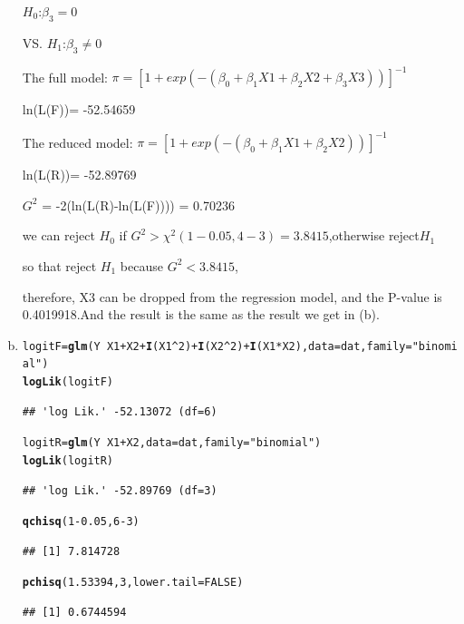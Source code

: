 \documentclass{article}\usepackage[]{graphicx}\usepackage[]{color}
\makeatletter
\newcommand{\hlnum}[1]{\textcolor[rgb]{0.686,0.059,0.569}{#1}}%
\newcommand{\hlstr}[1]{\textcolor[rgb]{0.192,0.494,0.8}{#1}}%
\newcommand{\hlopt}[1]{\textcolor[rgb]{0,0,0}{#1}}%
\newcommand{\hlstd}[1]{\textcolor[rgb]{0.345,0.345,0.345}{#1}}%
\newcommand{\hlkwb}[1]{\textcolor[rgb]{0.69,0.353,0.396}{#1}}%
\newcommand{\hlkwc}[1]{\textcolor[rgb]{0.333,0.667,0.333}{#1}}%
\newcommand{\hlkwd}[1]{\textcolor[rgb]{0.737,0.353,0.396}{\textbf{#1}}}%
\newenvironment{kframe}{%
 \def\at@end@of@kframe{}%
 \ifinner\ifhmode%
  \def\at@end@of@kframe{\end{minipage}}%
  \begin{minipage}{\columnwidth}%
 \fi\fi%
 \def\FrameCommand##1{\hskip\@totalleftmargin \hskip-\fboxsep
 \colorbox{shadecolor}{##1}\hskip-\fboxsep
     \hskip-\linewidth \hskip-\@totalleftmargin \hskip\columnwidth}%
 \MakeFramed {\advance\hsize-\width
   \@totalleftmargin\z@ \linewidth\hsize
   \@setminipage}}%
 {\par\unskip\endMakeFramed%
 \at@end@of@kframe}
\newenvironment{knitrout}{}{} %
\makeatother
\begin{document}
\begin{enumerate}[(a)]
\begin{center}
$H_0$:$\beta_3=0$

VS. $H_1$:$\beta_3 \ne 0$

The full model: $\pi = [1 + exp(-(\beta_0 + \beta_1 X1 + \beta_2 X2 + \beta_3 X3))]^{-1} $

ln(L(F))= -52.54659

The reduced model: $\pi = [1 + exp(-(\beta_0 + \beta_1 X1 + \beta_2 X2))]^{-1} $

ln(L(R))= -52.89769

$G^2$ = -2(ln(L(R)-ln(L(F)))) = 0.70236

we can reject $H_0$ if $G^2 > \chi^2(1-0.05, 4-3)=3.8415$,otherwise reject$H_1$

so that reject $H_1$ because $G^2 < 3.8415$,

therefore, X3 can be dropped from the regression model, and the P-value is 0.4019918.And the result is the same as the result we get in (b).
\end{center}

\item

\begin{knitrout}
\color{fgcolor}\begin{kframe}
\begin{alltt}
  \hlstd{logitF} \hlkwb{=} \hlkwd{glm}\hlstd{(Y} \hlopt{~} \hlstd{X1}\hlopt{+}\hlstd{X2}\hlopt{+}\hlkwd{I}\hlstd{(X1}\hlopt{^}\hlnum{2}\hlstd{)}\hlopt{+}\hlkwd{I}\hlstd{(X2}\hlopt{^}\hlnum{2}\hlstd{)}\hlopt{+}\hlkwd{I}\hlstd{(X1}\hlopt{*}\hlstd{X2),} \hlkwc{data} \hlstd{= dat,} \hlkwc{family} \hlstd{=} \hlstr{"binomial"}\hlstd{)}
  \hlkwd{logLik}\hlstd{(logitF)}
\end{alltt}
\begin{verbatim}
## 'log Lik.' -52.13072 (df=6)
\end{verbatim}
\begin{alltt}
  \hlstd{logitR} \hlkwb{=} \hlkwd{glm}\hlstd{(Y} \hlopt{~} \hlstd{X1}\hlopt{+}\hlstd{X2,} \hlkwc{data} \hlstd{= dat,} \hlkwc{family} \hlstd{=} \hlstr{"binomial"}\hlstd{)}
  \hlkwd{logLik}\hlstd{(logitR)}
\end{alltt}
\begin{verbatim}
## 'log Lik.' -52.89769 (df=3)
\end{verbatim}
\begin{alltt}
  \hlkwd{qchisq}\hlstd{(}\hlnum{1}\hlopt{-}\hlnum{0.05}\hlstd{,} \hlnum{6}\hlopt{-}\hlnum{3}\hlstd{)}
\end{alltt}
\begin{verbatim}
## [1] 7.814728
\end{verbatim}
\begin{alltt}
  \hlkwd{pchisq}\hlstd{(}\hlnum{1.53394}\hlstd{,} \hlnum{3}\hlstd{,} \hlkwc{lower.tail} \hlstd{=} \hlnum{FALSE}\hlstd{)}
\end{alltt}
\begin{verbatim}
## [1] 0.6744594
\end{verbatim}
\end{kframe}
\end{knitrout}


\end{enumerate}
\end{document}
